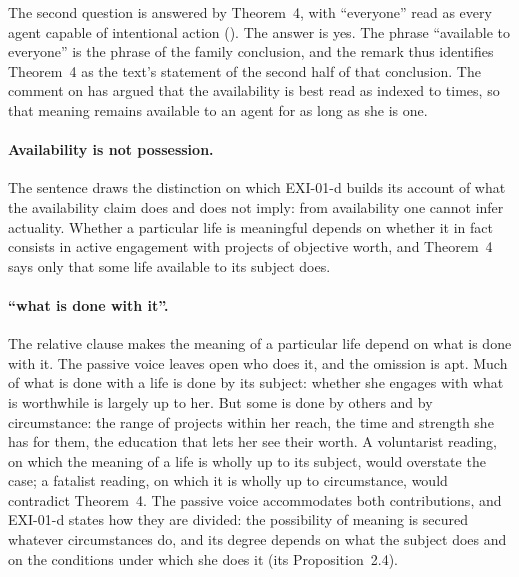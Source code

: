 
The second question is answered by Theorem~4, with \enquote{everyone} read as every agent capable of intentional action (). The answer is yes. The phrase \enquote{available to everyone} is the phrase of the family conclusion, and the remark thus identifies Theorem~4 as the text's statement of the second half of that conclusion. The comment on  has argued that the availability is best read as indexed to times, so that meaning remains available to an agent for as long as she is one.


\paragraph{Availability is not possession.} The sentence draws the distinction on which EXI-01-d builds its account of what the availability claim does and does not imply: from availability one cannot infer actuality. Whether a particular life is meaningful depends on whether it in fact consists in active engagement with projects of objective worth, and Theorem~4 says only that some life available to its subject does.

\paragraph{\enquote{what is done with it}.} The relative clause makes the meaning of a particular life depend on what is done with it. The passive voice leaves open who does it, and the omission is apt. Much of what is done with a life is done by its subject: whether she engages with what is worthwhile is largely up to her. But some is done by others and by circumstance: the range of projects within her reach, the time and strength she has for them, the education that lets her see their worth. A voluntarist reading, on which the meaning of a life is wholly up to its subject, would overstate the case; a fatalist reading, on which it is wholly up to circumstance, would contradict Theorem~4. The passive voice accommodates both contributions, and EXI-01-d states how they are divided: the possibility of meaning is secured whatever circumstances do, and its degree depends on what the subject does and on the conditions under which she does it (its Proposition~2.4).

